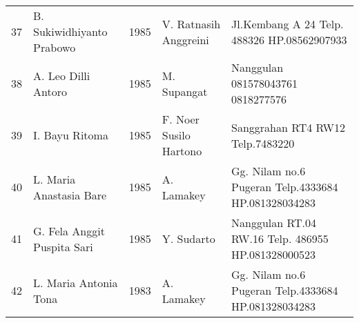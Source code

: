 \begin{longtable}{|r|p{2.75cm}|p{0.75cm}|p{2.75cm}|p{3cm}|}
37&B. Sukiwidhiyanto Prabowo&1985&V. Ratnasih Anggreini&Jl.Kembang A 24 Telp. 488326 HP.08562907933\\
38&A. Leo Dilli Antoro&1985&M. Supangat&Nanggulan 081578043761 0818277576\\
39&I. Bayu Ritoma&1985&F. Noer Susilo Hartono&Sanggrahan  RT4 RW12 Telp.7483220\\
40&L. Maria Anastasia Bare &1985&A. Lamakey&Gg. Nilam no.6 Pugeran Telp.4333684 HP.081328034283\\
41&G. Fela Anggit Puspita Sari&1985&Y. Sudarto&Nanggulan RT.04 RW.16 Telp. 486955 HP.081328000523\\
42&L. Maria Antonia Tona&1983&A. Lamakey&Gg. Nilam no.6 Pugeran Telp.4333684 HP.081328034283\\ \hline
\end{longtable}
\normalsize